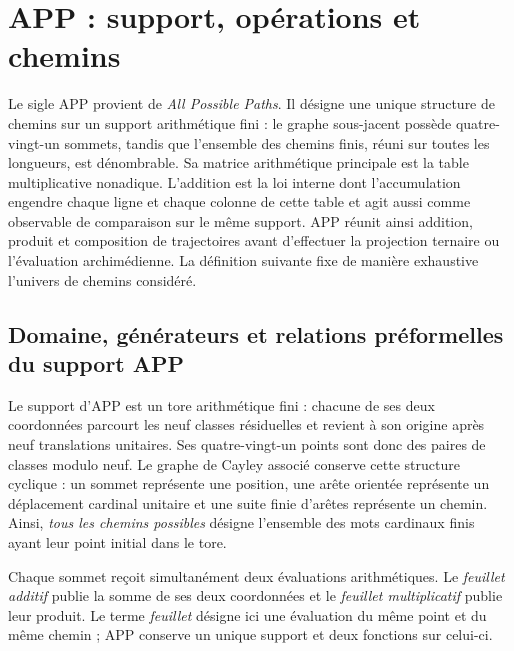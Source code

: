 \ifdefined\HMTAPPFormal
\chapter{APP : support, opérations et chemins}
\label{chap:app}

\noindent
Le sigle APP provient de \emph{All Possible Paths}. Il désigne une unique
structure de chemins sur un support arithmétique fini : le graphe
sous-jacent possède quatre-vingt-un sommets, tandis que l'ensemble des chemins
finis, réuni sur toutes les longueurs, est dénombrable. Sa matrice
arithmétique principale est la table multiplicative nonadique. L'addition est la loi
interne dont l'accumulation engendre chaque ligne et chaque colonne de cette table et agit
aussi comme observable de comparaison sur le même support. APP réunit ainsi
addition, produit et
composition de trajectoires avant d'effectuer la projection ternaire ou
l'évaluation archimédienne. La définition suivante fixe de manière exhaustive
l'univers de chemins considéré.

\section{Domaine, générateurs et relations préformelles du support APP}

Le support d'APP est un tore arithmétique fini : chacune de ses deux
coordonnées parcourt les neuf classes résiduelles et revient à son origine après
neuf translations unitaires. Ses quatre-vingt-un points sont donc des
paires de classes modulo neuf. Le graphe de Cayley associé conserve cette
structure cyclique : un sommet représente une position, une arête orientée
représente un déplacement cardinal unitaire et une suite finie
d'arêtes représente un chemin. Ainsi, \emph{tous les chemins
possibles} désigne l'ensemble des mots cardinaux finis ayant leur point
initial dans le tore.

Chaque sommet reçoit simultanément deux évaluations arithmétiques. Le
\emph{feuillet additif} publie la somme de ses deux coordonnées et le
\emph{feuillet multiplicatif} publie leur produit. Le terme \emph{feuillet}
désigne ici une évaluation du même point et du même chemin ; APP conserve
un unique support et deux fonctions sur celui-ci.

